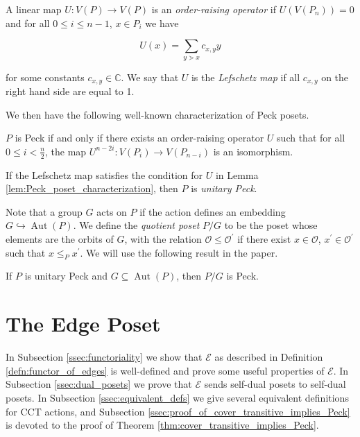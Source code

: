 \documentclass[smallextended, envcountsame, numbook]{svjour3}
\numberwithin{equation}{section}
\newcommand\Aut{\operatorname{Aut}}
\begin{document}
\begin{definition}
\label{defn:lefschetz}
A linear map $U\colon V(P)\rightarrow V(P)$ is an \textit{order-raising operator} if $U(V(P_n)) = 0$ and for all $0\le i\le n-1$, $x\in P_i$ we have

$$U(x) = \sum_{y\gtrdot x} c_{x,y}y$$

\noindent for some constants $c_{x,y}\in \mathbb{C}$.  We say that $U$ is the \textit{Lefschetz map} if all $c_{x,y}$ on the right hand side are equal to 1.
\end{definition}

\noindent We then have the following well-known characterization of Peck posets.

\begin{lemma}\label{lem:Peck_poset_characterization}
$P$ is Peck if and only if there exists an order-raising operator $U$ such that for all $0\le i < \frac{n}{2}$, the map $U^{n-2i}\colon V(P_i)\rightarrow V(P_{n-i})$ is an isomorphism.
\end{lemma}

\begin{definition}
If the Lefschetz map satisfies the condition for $U$ in Lemma \ref{lem:Peck_poset_characterization}, then $P$ is \textit{unitary Peck}.
\end{definition}

Note that a group $G$ acts on $P$ if the action defines an embedding $G\hookrightarrow \Aut(P)$. We define the \textit{quotient poset} $P/G$ to be the poset whose elements are the orbits of $G$, with the relation $\mathcal{O}\le \mathcal{O}^\prime$ if there exist $x\in \mathcal{O}$, $x^\prime\in \mathcal{O}^\prime$ such that $x\le_{P} x^\prime$.  We will use the following result in the paper.

\begin{theorem}
\label{thm:quotients_of_unitary_peck_posets}
If $P$ is unitary Peck and $G\subseteq\Aut(P)$, then $P/G$ is Peck.
\end{theorem}



\section{The Edge Poset}
\label{sec:functor_of_edges}

In Subsection \ref{ssec:functoriality} we show that $\mathcal E$ as described in Definition \ref{defn:functor_of_edges} is well-defined and prove some useful properties of $\mathcal E$.  In Subsection \ref{ssec:dual_posets} we prove that $\mathcal{E}$ sends self-dual posets to self-dual posets.  In Subsection \ref{ssec:equivalent_defs} we give several equivalent definitions for CCT actions, and Subsection \ref{ssec:proof_of_cover_transitive_implies_Peck} is devoted to the proof of Theorem \ref{thm:cover_transitive_implies_Peck}.
\end{document}

